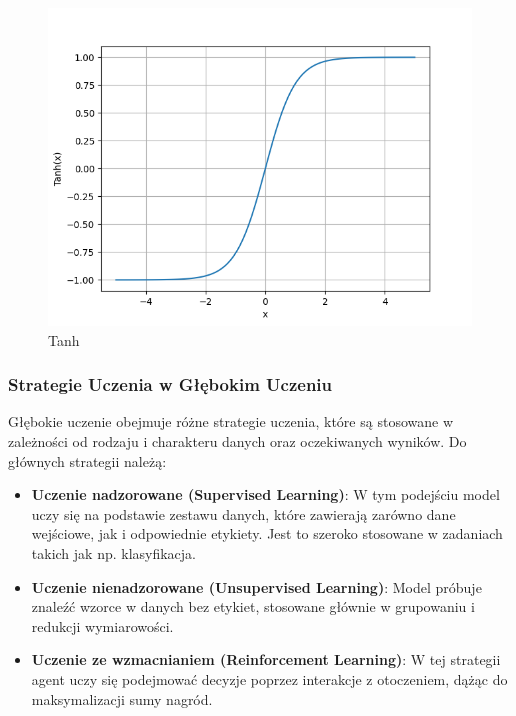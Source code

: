 \begin{figure}[ht]
    \begin{minipage}[t]{0.3\linewidth}
        \includegraphics[width=\linewidth]{Rozdziały/02.Podstawy_teoretyczne/Obrazy/tanh.png}
        \caption{Tanh}
        \label{fig:image16}
    \end{minipage}
\end{figure}


\subsubsection*{Strategie Uczenia w Głębokim Uczeniu}
Głębokie uczenie obejmuje różne strategie uczenia, które są stosowane w zależności od rodzaju i charakteru danych oraz oczekiwanych wyników. Do głównych strategii należą:

\begin{itemize}
    \item \textbf{Uczenie nadzorowane (Supervised Learning)}: W tym podejściu model uczy się na podstawie zestawu danych, które zawierają zarówno dane wejściowe, jak i odpowiednie etykiety. Jest to szeroko stosowane w zadaniach takich jak np. klasyfikacja.
    \item \textbf{Uczenie nienadzorowane (Unsupervised Learning)}: Model próbuje znaleźć wzorce w danych bez etykiet, stosowane głównie w grupowaniu i redukcji wymiarowości.
    \item \textbf{Uczenie ze wzmacnianiem (Reinforcement Learning)}: W tej strategii agent uczy się podejmować decyzje poprzez interakcje z otoczeniem, dążąc do maksymalizacji sumy nagród.
\end{itemize}


